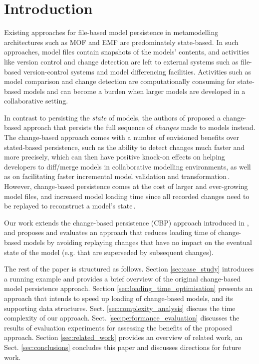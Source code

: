 \documentclass{llncs}
\begin{document}
\section{Introduction}
\label{sec:introduction}
Existing approaches for file-based model persistence in metamodelling architectures such as MOF and EMF are predominately state-based.
In such approaches, model files contain snapshots of the models' contents, and activities like version control and change detection are left to external systems such as file-based version-control systems and model differencing facilities.
Activities such as model comparison and change detection are computationally consuming for state-based models and can become a burden when larger models are developed in a collaborative setting. 

In contrast to persisting the \emph{state} of models, the authors of \cite{yohannis2017turning} proposed a change-based approach that persists the full sequence of \emph{changes} made to models instead.
The change-based approach comes with a number of envisioned benefits over stated-based persistence, such as the ability to detect changes much faster and more precisely, which can then have positive knock-on effects on helping developers to diff/merge models in collaborative modelling environments, as well as on facilitating faster incremental model validation and transformation\,\cite{rath2012derived,ogunyomi2015property}.
However, change-based persistence comes at the cost of larger and ever-growing model files, and increased model loading time since all recorded changes need to be replayed to reconstruct a model's state\,\cite{yohannis2017turning}.   

Our work extends the change-based persistence (CBP) approach introduced in \cite{yohannis2017turning}, and proposes and evaluates an approach that reduces loading time of change-based models by avoiding replaying changes that have no impact on the eventual state of the model (e.g. that are superseded by subsequent changes).

The rest of the paper is structured as follows. Section \ref{sec:case_study} introduces a running example and provides a brief overview of the original change-based model persistence approach.
Section \ref{sec:loading_time_optimisation} presents an approach that intends to speed up loading of change-based models, and its supporting data structures. Sect. \ref{sec:complexity_analysis} discuss the time complexity of our approach. Sect. \ref{sec:performance_evaluation} discusses the results of evaluation experiments for assessing the benefits of the proposed approach. Section \ref{sec:related_work} provides an overview of related work, an Sect. \ref{sec:conclusions} concludes this paper and discusses directions for future work.
\end{document}
